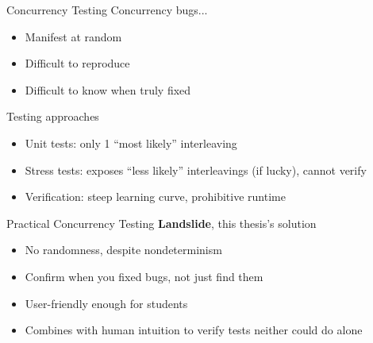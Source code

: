 \documentclass[xcolor=dvipsnames]{beamer}
\begin{document}
\begin{frame}{Concurrency Testing} %
	Concurrency bugs...
	\begin{itemize}
		\item Manifest at random
		\item Difficult to reproduce
		\item Difficult to know when truly fixed %
	\end{itemize}
	\linegap

	Testing approaches
	\begin{itemize}
		\item Unit tests: only 1 ``most likely'' interleaving
		\item Stress tests: exposes ``less likely'' interleavings (if lucky), %
			cannot verify
		\item Verification: steep learning curve, prohibitive runtime
	\end{itemize}
\end{frame}
\begin{frame}{Practical Concurrency Testing}
	\textbf{Landslide}, this thesis's solution
	\begin{itemize}
		\item No randomness, despite nondeterminism
		\item Confirm when you fixed bugs, not just find them %
		\item User-friendly enough for students
		\item Combines with human intuition to verify tests neither could do alone
	\end{itemize}
\end{frame}
\end{document}
